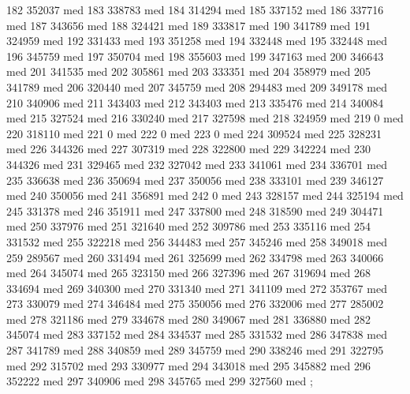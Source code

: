 {182 352037 med
183 338783 med
184 314294 med
185 337152 med
186 337716 med
187 343656 med
188 324421 med
189 333817 med
190 341789 med
191 324959 med
192 331433 med
193 351258 med
194 332448 med
195 332448 med
196 345759 med
197 350704 med
198 355603 med
199 347163 med
200 346643 med
201 341535 med
202 305861 med
203 333351 med
204 358979 med
205 341789 med
206 320440 med
207 345759 med
208 294483 med
209 349178 med
210 340906 med
211 343403 med
212 343403 med
213 335476 med
214 340084 med
215 327524 med
216 330240 med
217 327598 med
218 324959 med
219 0 med
220 318110 med
221 0 med
222 0 med
223 0 med
224 309524 med
225 328231 med
226 344326 med
227 307319 med
228 322800 med
229 342224 med
230 344326 med
231 329465 med
232 327042 med
233 341061 med
234 336701 med
235 336638 med
236 350694 med
237 350056 med
238 333101 med
239 346127 med
240 350056 med
241 356891 med
242 0 med
243 328157 med
244 325194 med
245 331378 med
246 351911 med
247 337800 med
248 318590 med
249 304471 med
250 337976 med
251 321640 med
252 309786 med
253 335116 med
254 331532 med
255 322218 med
256 344483 med
257 345246 med
258 349018 med
259 289567 med
260 331494 med
261 325699 med
262 334798 med
263 340066 med
264 345074 med
265 323150 med
266 327396 med
267 319694 med
268 334694 med
269 340300 med
270 331340 med
271 341109 med
272 353767 med
273 330079 med
274 346484 med
275 350056 med
276 332006 med
277 285002 med
278 321186 med
279 334678 med
280 349067 med
281 336880 med
282 345074 med
283 337152 med
284 334537 med
285 331532 med
286 347838 med
287 341789 med
288 340859 med
289 345759 med
290 338246 med
291 322795 med
292 315702 med
293 330977 med
294 343018 med
295 345882 med
296 352222 med
297 340906 med
298 345765 med
299 327560 med
};
